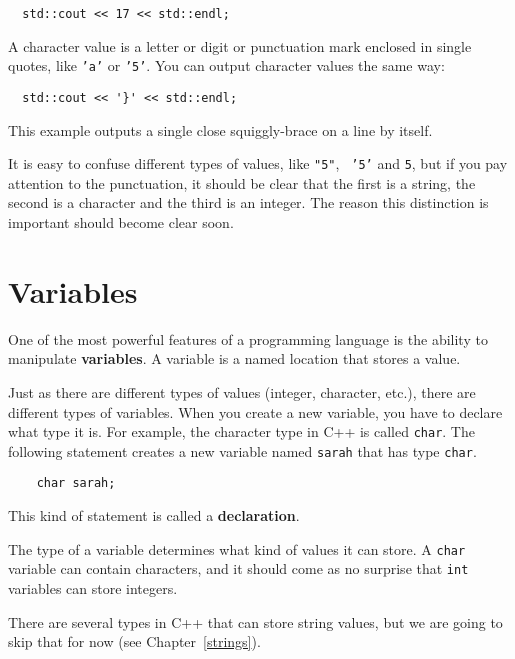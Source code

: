 \begin{lstlisting}
  std::cout << 17 << std::endl;
\end{lstlisting}

A character value is a letter or digit or punctuation mark
enclosed in single quotes, like {\tt 'a'} or {\tt '5'}.
You can output character values the same way:


\begin{lstlisting}
  std::cout << '}' << std::endl;
\end{lstlisting}

This example outputs a single close squiggly-brace on a line
by itself.

It is easy to confuse different types of values, like {\tt "5"}, {\tt
'5'} and {\tt 5}, but if you pay attention to the punctuation, it
should be clear that the first is a string, the second is a character
and the third is an integer.  The reason this distinction is important
should become clear soon.

\section {Variables}

One of the most powerful features of a programming language is the
ability to manipulate {\bf variables}.  A variable is a named location
that stores a value.  

Just as there are different types of values (integer, character,
etc.), there are different types of variables.  When you create a new
variable, you have to declare what type it is.  For example, the
character type in C++ is called {\tt char}.  The following statement
creates a new variable named {\tt sarah} that has type {\tt char}.

\begin{lstlisting}
    char sarah;
\end{lstlisting}

This kind of statement is called a {\bf declaration}.

The type of a variable determines what kind of values it can
store.  A {\tt char} variable can contain characters, and it should
come as no surprise that {\tt int} variables can store integers.

There are several types in C++ that can store string values, but we
are going to skip that for now (see Chapter~\ref{strings}).


